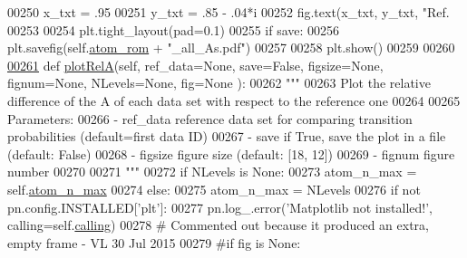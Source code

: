 \begin{DoxyCode}
{{00250             x\_txt = .95
00251             y\_txt = .85 - .04*i 
00252             fig.text(x\_txt, y\_txt, \textcolor{stringliteral}{"Ref. %
00253 
00254         plt.tight\_layout(pad=0.1)
00255         \textcolor{keywordflow}{if} save:
00256             plt.savefig(self.\hyperlink{classpyneb_1_1plot_1_1plot_atomic_data_1_1_data_plot_a334c448311ed9dc8cd700af504e06254}{atom\_rom} + \textcolor{stringliteral}{"\_all\_As.pdf"})
00257     
00258         plt.show()      
00259         
00260 
\hypertarget{plot_atomic_data_8py_source_l00261}{}\hyperlink{classpyneb_1_1plot_1_1plot_atomic_data_1_1_data_plot_a9fc5e1df4de9471e26b20018ce89eb9d}{00261}     \textcolor{keyword}{def }\hyperlink{classpyneb_1_1plot_1_1plot_atomic_data_1_1_data_plot_a9fc5e1df4de9471e26b20018ce89eb9d}{plotRelA}(self, ref\_data=None, save=False, figsize=None, fignum=None, NLevels=None, fig=None
      ):
00262         \textcolor{stringliteral}{"""}
00263 \textcolor{stringliteral}{        Plot the relative difference of the A of each data set with respect to the reference one}
00264 \textcolor{stringliteral}{}
00265 \textcolor{stringliteral}{        Parameters:}
00266 \textcolor{stringliteral}{            - ref\_data       reference data set for comparing transition probabilities (default=first data
       ID)}
00267 \textcolor{stringliteral}{            - save           if True, save the plot in a file (default: False)}
00268 \textcolor{stringliteral}{            - figsize        figure size (default: [18, 12])}
00269 \textcolor{stringliteral}{            - fignum         figure number}
00270 \textcolor{stringliteral}{}
00271 \textcolor{stringliteral}{        """}
00272         \textcolor{keywordflow}{if} NLevels \textcolor{keywordflow}{is} \textcolor{keywordtype}{None}:
00273             atom\_n\_max = self.\hyperlink{classpyneb_1_1plot_1_1plot_atomic_data_1_1_data_plot_a668572cfe9a684e7195535d60d343938}{atom\_n\_max}
00274         \textcolor{keywordflow}{else}:
00275             atom\_n\_max = NLevels
00276         \textcolor{keywordflow}{if} \textcolor{keywordflow}{not} pn.config.INSTALLED[\textcolor{stringliteral}{'plt'}]:
00277             pn.log\_.error(\textcolor{stringliteral}{'Matplotlib not installed!'}, calling=self.\hyperlink{classpyneb_1_1plot_1_1plot_atomic_data_1_1_data_plot_a393a133b607541c57d5ebc5a34687e3f}{calling})
00278         \textcolor{comment}{# Commented out because it produced an extra, empty frame - VL 30 Jul 2015}
00279         \textcolor{comment}{#if fig is None:}
}}}
\end{DoxyCode}
